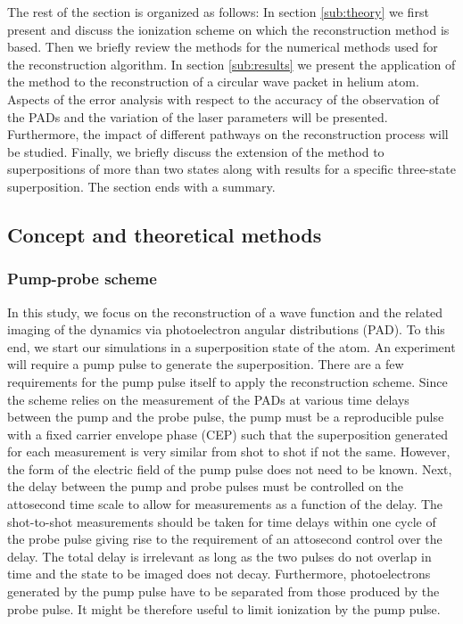 The rest of the section is organized as follows: In section \ref{sub:theory} we first present and discuss the ionization scheme on which the reconstruction method is based. Then we briefly review the methods for the numerical methods used for the reconstruction algorithm. In section \ref{sub:results} we present the application of the method to the reconstruction of a circular wave packet in helium atom. Aspects of the error analysis with respect to the accuracy of the observation of the PADs and the variation of the laser parameters will be presented. Furthermore, the impact of different pathways on the reconstruction process will be studied. Finally, we briefly discuss the extension of the method to superpositions of more than two states along with results for a specific three-state superposition. The section ends with a summary. 

\subsection{\label{sub:theory}Concept and theoretical methods}

\subsubsection{Pump-probe scheme}

In this study, we focus on the reconstruction of a wave function and the related imaging of the dynamics via photoelectron angular distributions (PAD). To this end, we start our simulations in a superposition state of the atom. An experiment will require a pump pulse to generate the superposition. There are a few requirements for the pump pulse itself to apply the reconstruction scheme. Since the scheme relies on the measurement of the PADs at various time delays between the pump and the probe pulse, the pump must be a reproducible pulse with a fixed carrier envelope phase (CEP) such that the superposition generated for each measurement is very similar from shot to shot if not the same. However, the form of the electric field of the pump pulse does not need to be known. Next, the delay between the pump and probe pulses must be controlled on the attosecond time scale to allow for measurements as a function of the delay. The shot-to-shot measurements should be taken for time delays within one cycle of the probe pulse giving rise to the requirement of an attosecond control over the delay. The total delay is irrelevant as long as the two pulses do not overlap in time and the state to be imaged does not decay. Furthermore,
photoelectrons generated by the pump pulse have to be separated from those produced by the probe pulse. It might be therefore useful to limit ionization by the pump pulse.

